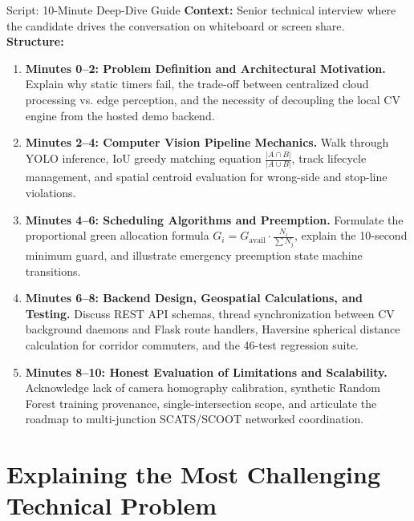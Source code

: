 \documentclass[11pt,a4paper,oneside]{report}
\begin{document}
\begin{interviewq}{Script: 10-Minute Deep-Dive Guide}
\textbf{Context:} Senior technical interview where the candidate drives the conversation on whiteboard or screen share.\\
\textbf{Structure:}
\begin{enumerate}
    \item \textbf{Minutes 0--2: Problem Definition and Architectural Motivation.} Explain why static timers fail, the trade-off between centralized cloud processing vs. edge perception, and the necessity of decoupling the local CV engine from the hosted demo backend.
    \item \textbf{Minutes 2--4: Computer Vision Pipeline Mechanics.} Walk through YOLO inference, IoU greedy matching equation $\frac{|A \cap B|}{|A \cup B|}$, track lifecycle management, and spatial centroid evaluation for wrong-side and stop-line violations.
    \item \textbf{Minutes 4--6: Scheduling Algorithms and Preemption.} Formulate the proportional green allocation formula $G_i = G_{\text{avail}} \cdot \frac{N_i}{\sum N_j}$, explain the 10-second minimum guard, and illustrate emergency preemption state machine transitions.
    \item \textbf{Minutes 6--8: Backend Design, Geospatial Calculations, and Testing.} Discuss REST API schemas, thread synchronization between CV background daemons and Flask route handlers, Haversine spherical distance calculation for corridor commuters, and the 46-test regression suite.
    \item \textbf{Minutes 8--10: Honest Evaluation of Limitations and Scalability.} Acknowledge lack of camera homography calibration, synthetic Random Forest training provenance, single-intersection scope, and articulate the roadmap to multi-junction SCATS/SCOOT networked coordination.
\end{enumerate}
\end{interviewq}

\section{Explaining the Most Challenging Technical Problem}
\label{sec:script_challenging_problem}
\end{document}
